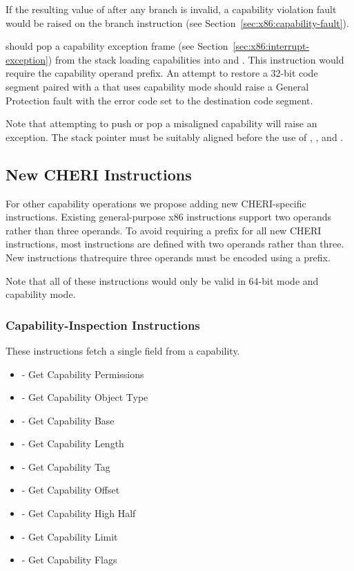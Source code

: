 If the resulting value of \CIP{} after any branch
is invalid, a capability violation fault would be raised on the branch
instruction (see Section~\ref{sec:x86:capability-fault}).

 should pop a capability exception frame (see
Section~\ref{sec:x86:interrupt-exception}) from the stack loading
capabilities into \CIP{} and \CSP{}.  This instruction would require
the capability operand prefix.  An attempt to restore a 32-bit code
segment paired with a \CIP{} that uses capability mode should raise a
General Protection fault with the error code set to the destination
code segment.

Note that attempting to push or pop a misaligned capability will raise
an exception.  The stack pointer must be suitably aligned before the
use of , , and .

\subsection{New CHERI Instructions}

For other capability operations we
propose adding new CHERI-specific instructions.
Existing general-purpose x86 instructions support two operands rather
than three operands.  To avoid requiring a \VEX{} prefix for all new
CHERI instructions, most instructions are defined with two operands
rather than three.  New instructions thatrequire three operands must
be encoded using a \VEX{} prefix.

Note that all of these instructions would only be valid in 64-bit mode
and capability mode.

\subsubsection{Capability-Inspection Instructions}

These instructions fetch a single field from a capability.

\begin{itemize}
  \item {} - Get Capability Permissions
  \item {} - Get Capability Object Type
  \item {} - Get Capability Base
  \item {} - Get Capability Length
  \item {} - Get Capability Tag
  \item {} - Get Capability Offset
  \item {} - Get Capability High Half
  \item {} - Get Capability Limit
  \item {} - Get Capability Flags
\end{itemize}

